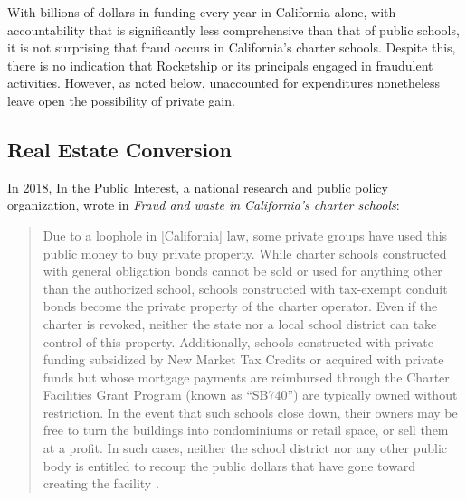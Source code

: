 With billions of dollars in funding every year in California alone, with accountability that is significantly less comprehensive than that of public schools, it is not surprising that fraud occurs in California's charter schools. Despite this, there is no indication that Rocketship or its principals engaged in fraudulent activities. However, as noted below, unaccounted for expenditures nonetheless leave open the possibility of private gain. 

\subsection{Real Estate Conversion}%
\label{sec:real-estate-conv}\indent%

In 2018, In the Public Interest, a national research and public policy organization, wrote in \textit{Fraud and waste
in California's charter schools}:
\begin{quotation}\noindent
Due to a loophole in [California] law, some private groups have used this public money to buy private property. While charter schools constructed with general obligation bonds cannot be sold or used for anything other than the authorized school, schools constructed with tax-exempt conduit bonds become the private property of the charter operator. Even if the charter is revoked, neither the state nor a local school district can take control of this property. Additionally, schools constructed with private funding subsidized by New Market Tax Credits or acquired with private funds but whose mortgage payments are reimbursed through the Charter Facilities Grant Program (known as “SB740”) are typically owned without restriction. In the event that such schools close down, their owners may be free to turn the buildings into condominiums or retail space, or sell them at a profit. In such cases, neither the school district nor any other public body is entitled to recoup the public dollars that have gone toward creating the facility \parencite[6]{ITPI2018}.
\end{quotation}

